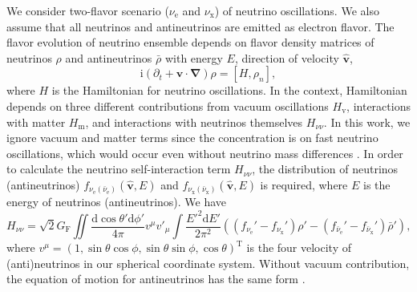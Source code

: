 \documentclass[%
preprint,
 amsmath,amssymb,
 aps,
 prd
]{revtex4-1}
\newcommand{\ii}{\mathrm i}
\begin{document}
We consider two-flavor scenario ($\nu_{\mathrm e}$ and $\nu_{\mathrm x}$) of neutrino oscillations. We also assume that all neutrinos and antineutrinos are emitted as electron flavor. The flavor evolution of neutrino ensemble depends on flavor density matrices of neutrinos $\rho$ and antineutrinos $\bar\rho$ with energy $E$, direction of velocity $\hat{\mathbf v}$,
\begin{equation}
\ii (\partial_t + \mathbf v\cdot \mathbf{\nabla}) \rho = \left[H, \rho_n \right],
\label{eqn-liouville-eqn}
\end{equation}
where $H$ is the Hamiltonian for neutrino oscillations. In the context, Hamiltonian depends on three different contributions from vacuum oscillations $H_{\mathrm v}$, interactions with matter $H_{\mathrm m}$, and interactions with neutrinos themselves $H_{\nu\nu}$. In this work, we ignore vacuum and matter terms since the concentration is on fast neutrino oscillations, which would occur even without neutrino mass differences \cite{Chakraborty2016,Dasgupta2017}. In order to calculate the neutrino self-interaction term $H_{\nu\nu}$, the distribution of neutrinos (antineutrinos) $f_{\nu_{\mathrm e}(\bar \nu_{\mathrm e})}(\hat{\mathbf v}, E)$ and $f_{\nu_{\mathrm x}(\bar \nu_{\mathrm x})}(\hat{\mathbf v}, E)$ is required, where $E$ is the energy of neutrinos (antineutrinos). We have
\begin{equation}
H_{\nu\nu} = \sqrt{2} G_{\mathrm F} \iint \frac{\mathrm d \cos\theta' \mathrm d\phi'}{4\pi} v^\mu v'_\mu \int \frac{E'^2 \mathrm d E'}{2\pi^2} \left( (f_{\nu_{\mathrm e}}' - f_{\nu_{\mathrm x}}' )\rho' -  (f_{\bar\nu_{\mathrm e}}' - f_{\bar\nu_{\mathrm x}}' ) \bar\rho' \right),
\end{equation}
where $v^\mu = ( 1, \sin\theta\cos\phi, \sin\theta\sin\phi, \cos\theta )^{\mathrm T}$ is the four velocity of (anti)neutrinos in our spherical coordinate system. Without vacuum contribution, the equation of motion for antineutrinos has the same form \cite{Duan2010}.
\end{document}

